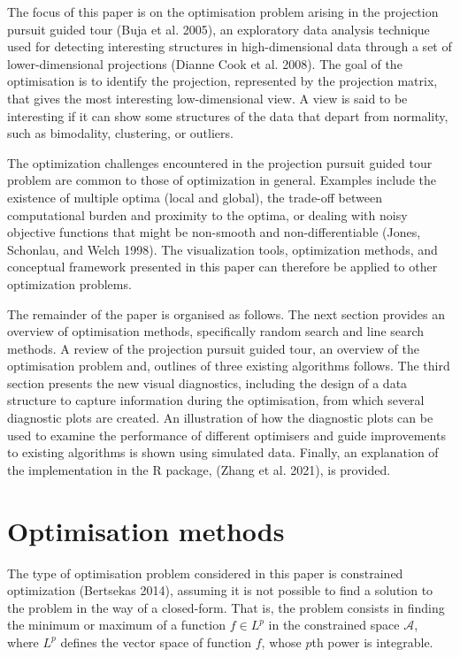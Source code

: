 The focus of this paper is on the optimisation problem arising in the projection pursuit guided tour (Buja et al. 2005), an exploratory data analysis technique used for detecting interesting structures in high-dimensional data through a set of lower-dimensional projections (Dianne Cook et al. 2008). The goal of the optimisation is to identify the projection, represented by the projection matrix, that gives the most interesting low-dimensional view. A view is said to be interesting if it can show some structures of the data that depart from normality, such as bimodality, clustering, or outliers.

The optimization challenges encountered in the projection pursuit guided tour problem are common to those of optimization in general. Examples include the existence of multiple optima (local and global), the trade-off between computational burden and proximity to the optima, or dealing with noisy objective functions that might be non-smooth and non-differentiable (Jones, Schonlau, and Welch 1998). The visualization tools, optimization methods, and conceptual framework presented in this paper can therefore be applied to other optimization problems.

The remainder of the paper is organised as follows. The next section provides an overview of optimisation methods, specifically random search and line search methods. A review of the projection pursuit guided tour, an overview of the optimisation problem and, outlines of three existing algorithms follows. The third section presents the new visual diagnostics, including the design of a data structure to capture information during the optimisation, from which several diagnostic plots are created. An illustration of how the diagnostic plots can be used to examine the performance of different optimisers and guide improvements to existing algorithms is shown using simulated data. Finally, an explanation of the implementation in the R package,  (Zhang et al. 2021), is provided.

\hypertarget{optim}{%
\section{Optimisation methods}\label{optim}}

The type of optimisation problem considered in this paper is constrained optimization (Bertsekas 2014), assuming it is not possible to find a solution to the problem in the way of a closed-form. That is, the problem consists in finding the minimum or maximum of a function \(f \in L^p\) in the constrained space \(\mathcal{A}\), where \(L^p\) defines the vector space of function \(f\), whose \(p\)th power is integrable.

